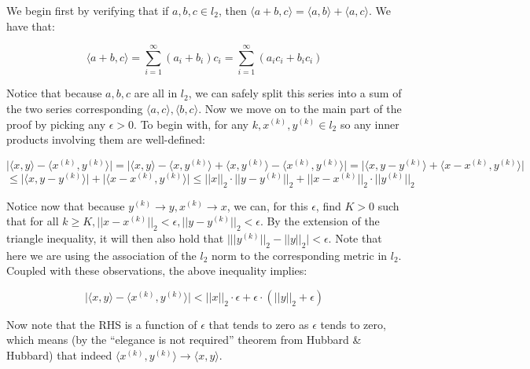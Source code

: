 \begin{solution}
    
    We begin first by verifying that if $a, b, c \in l_2$, then $\langle a + b, c \rangle = \langle a, b \rangle + \langle a, c \rangle$.
    We have that:

    $$\langle a + b, c \rangle = \sum_{i=1}^{\infty}(a_i + b_i)c_i = \sum_{i=1}^{\infty}(a_ic_i + b_ic_i)$$

    Notice that because $a, b, c$ are all in $l_2$, we can safely split this series into a sum of the two series corresponding $\langle a, c \rangle, \langle b, c \rangle$.
    Now we move on to the main part of the proof by picking any $\epsilon > 0$.
    To begin with, for any $k, x^{(k)}, y^{(k)} \in l_2$ so any inner products involving them are well-defined:

    $$\lvert \langle x, y \rangle - \langle x^{(k)}, y^{(k)} \rangle \rvert = \lvert \langle x, y \rangle - \langle x, y^{(k)} \rangle + \langle x, y^{(k)} \rangle - \langle x^{(k)}, y^{(k)} \rangle \rvert = \lvert \langle x, y - y^{(k)} \rangle + \langle x - x^{(k)}, y^{(k)} \rangle \rvert$$
    $$\leq \lvert \langle x, y - y^{(k)} \rangle \rvert + \lvert \langle x - x^{(k)}, y^{(k)} \rangle \rvert \leq \lvert \lvert x \rvert \rvert_2 \cdot \lvert \lvert y - y^{(k)} \rvert \rvert_2 + \lvert \lvert x - x^{(k)} \rvert \rvert_2 \cdot \lvert \lvert y^{(k)} \rvert \rvert_2$$

    Notice now that because $y^{(k)} \rightarrow y, x^{(k)} \rightarrow x$, we can, for this $\epsilon$, find $K > 0$ such that for all $k \geq K, \lvert \lvert x - x^{(k)} \rvert \rvert_2 < \epsilon, \lvert \lvert y - y^{(k)} \rvert \rvert_2 < \epsilon$.
    By the extension of the triangle inequality, it will then also hold that $\bigl \lvert \lvert \lvert y^{(k)} \rvert \rvert_2 - \lvert \lvert y \rvert \rvert_2 \bigr \rvert < \epsilon$.
    Note that here we are using the association of the $l_2$ norm to the corresponding metric in $l_2$.
    Coupled with these observations, the above inequality implies:

    $$\lvert \langle x, y \rangle - \langle x^{(k)}, y^{(k)} \rangle \rvert < \lvert \lvert x \rvert \rvert_2 \cdot \epsilon + \epsilon \cdot (\lvert \lvert y \rvert \rvert_2 + \epsilon)$$

    Now note that the RHS is a function of $\epsilon$ that tends to zero as $\epsilon$ tends to zero, which means (by the ``elegance is not required'' theorem from Hubbard \& Hubbard) that indeed $\langle x^{(k)}, y^{(k)} \rangle \rightarrow \langle x, y \rangle$.
\end{solution}

